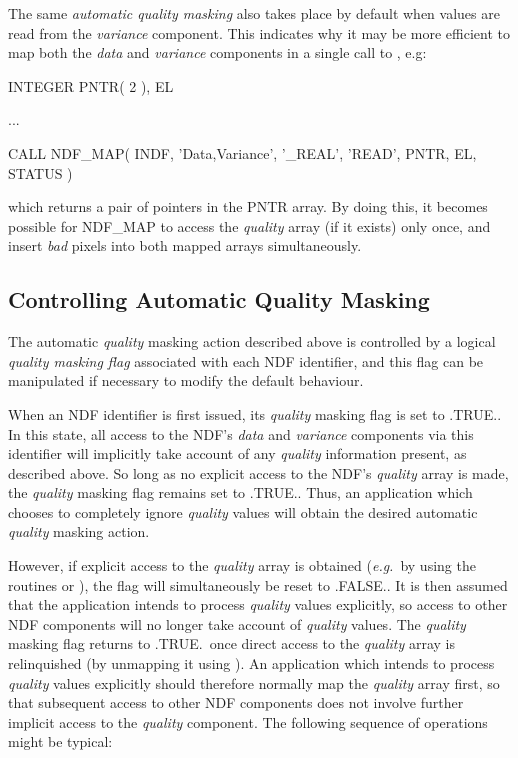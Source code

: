 \documentclass[twoside,11pt,nolof]{starlink}
\providecommand{\st}[1]{{\emph{#1}}}
\begin{document}
The same \st{automatic quality masking\/} also takes place by default when
values are read from the \st{variance\/} component.
This indicates why it may be more efficient to map both the \st{data\/} and
\st{variance\/} components in a single call to , e.g:

\small
\begin{terminalv}
      INTEGER PNTR( 2 ), EL

      ...

      CALL NDF_MAP( INDF, 'Data,Variance', '_REAL', 'READ', PNTR, EL, STATUS )
\end{terminalv}
\normalsize

which returns a pair of pointers in the PNTR array.
By doing this, it becomes possible for NDF\_MAP to access the \st{quality\/}
array (if it exists) only once, and insert \st{bad\/} pixels into both mapped
arrays simultaneously.

\subsection{Controlling Automatic Quality Masking}

The automatic \st{quality\/} masking action described above is controlled by a
logical \st{quality masking flag\/} associated with each NDF identifier, and
this flag can be manipulated if necessary to modify the default behaviour.

When an NDF identifier is first issued, its \st{quality\/} masking flag is set to
.TRUE..
In this state, all access to the NDF's \st{data\/} and \st{variance\/} components
via this identifier will implicitly take account of any \st{quality\/}
information present, as described above.
So long as no explicit access to the NDF's \st{quality\/} array is made, the
\st{quality\/} masking flag remains set to .TRUE..
Thus, an application which chooses to completely ignore \st{quality\/} values
will obtain the desired automatic \st{quality\/} masking action.

However, if explicit access to the \st{quality\/} array is obtained
(\st{e.g.}\ by using the routines  or
), the flag will
simultaneously be reset to .FALSE..
It is then assumed that the application intends to process \st{quality\/} values
explicitly, so access to other NDF components will no longer take account of
\st{quality\/} values.
The \st{quality\/} masking flag returns to .TRUE.\ once direct access to the
\st{quality\/} array is relinquished (by unmapping it using ).
An application which intends to process \st{quality\/} values explicitly should
therefore normally map the \st{quality\/} array first, so that subsequent access
to  other NDF components does not involve further implicit access to
the \st{quality\/} component.
The following sequence of operations might be typical:
\end{document}
